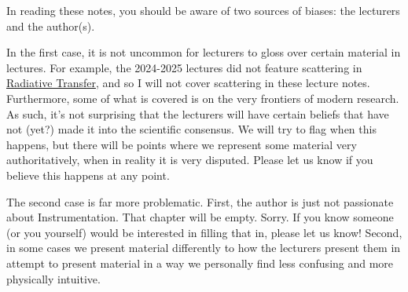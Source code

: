 \documentclass[a4paper,11pt]{report}
\begin{document}
\begin{sloppypar}
\begin{comment}
  Despite the vast diversity in C5, there are a few common themes (which are by no means unique to C5) that pop up throughout the course. I'll try to flag them clearly so that the reader can hopefully experience some kind of continuity when studying this course.  I have in mind three key themes:
  \begin{enumerate}
      \item The Role of \textbf{Scales}: The atmospheres and oceans are complex systems consisting of various phenomena on multiple spatio-temporal scales. At times we will exploit this by either a) noting empirical facts regarding the spatio-temporal scale of a phenomenon, or b) specifying a spatio-temporal scale to focus on a phenomenon.
      \item The Role of \textbf{Assumptions}: We'll make many assumptions throughout this course to simplify and solve the equations governing the phenomena under consideration. It's worth always keeping in mind the validity of this assumption, and why we make it. Sometimes, we make an assumptions simply for teaching purposes: real climate models numerically integrate this. Other times, the assumption. Sometimes assumptions are valid not simply due to luck but due to dynamical reasons that force it to be the case.
      \item A 3rd theme idk lol:
  \end{enumerate}
\end{comment}

In reading these notes, you should be aware of two sources of biases: the lecturers and the author(s).

In the first case, it is not uncommon for lecturers to gloss over certain material in lectures. For example, the 2024-2025 lectures did not feature scattering in \hyperref[Radiative Transfer]{Radiative Transfer}, and so I will not cover scattering in these lecture notes. Furthermore, some of what is covered is on the very frontiers of modern research. As such, it's not surprising that the lecturers will have certain beliefs that have not (yet?) made it into the scientific consensus. We will try to flag when this happens, but there will be points where we represent some material very authoritatively, when in reality it is very disputed. Please let us know if you believe this happens at any point.

The second case is far more problematic. First, the author is just not passionate about Instrumentation. That chapter will be empty. Sorry. If you know someone (or you yourself) would be interested in filling that in, please let us know! Second, in some cases we present material differently to how the lecturers present them in attempt to present material in a way we personally find less confusing and more physically intuitive.


\end{sloppypar}
\end{document}
